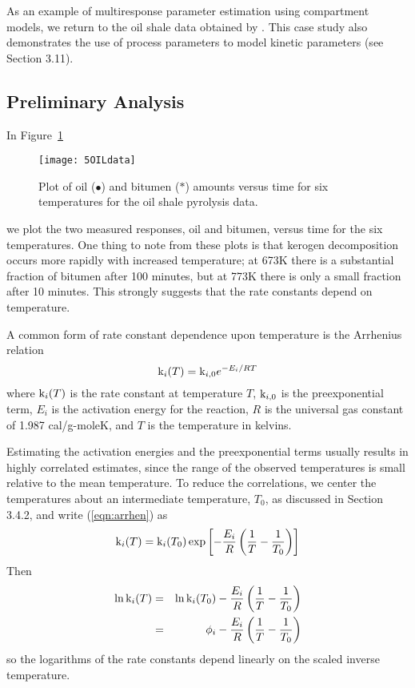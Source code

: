 As an example of multiresponse parameter estimation
using compartment models, we return to the oil shale data obtained by
.
This case study also demonstrates the use of process
parameters to model kinetic parameters (see Section 3.11).
\subsection{Preliminary Analysis}

In Figure~\ref{fig:OILdata}
\begin{figure}
  \centerline{\texttt{[image: 5OILdata]}}%
  \caption{\label{fig:OILdata}
  Plot of oil ($\bullet$) and bitumen ($*$) amounts versus time
  for six temperatures for the oil shale pyrolysis data.
  }
\end{figure}
we plot the two measured responses, oil and bitumen, versus time
for the six temperatures.
One thing to note from these plots is that kerogen decomposition
occurs more rapidly with increased temperature;
at 673K there is a substantial fraction
of bitumen after 100 minutes, but at 773K there
is only a small fraction after 10 minutes.
This strongly suggests that the rate constants depend on temperature.

A common form of rate constant dependence upon temperature
is the Arrhenius relation
$$\label{eqn:arrhen}
{\rm k}_i ( T ) = {\rm k}_{i,0} 
e^{{-} E_i / R T}
$$
where $\mbox{\rm k}_i ( T )$ is the rate constant at temperature $T$,
$\mbox{\rm k}_{i,0}$ is the preexponential term, $E_{i}$ is the activation
energy for the reaction, $R$ is the universal gas constant of 1.987
cal/g-moleK, and $T$ is the temperature in kelvins.

Estimating the activation energies and the preexponential
terms usually results in highly correlated estimates, since
the range of the observed temperatures is small
relative to the mean temperature.
To reduce the correlations, we center the temperatures about
an intermediate temperature, $T_{0}$, as discussed in Section 3.4.2,
and write (\ref{eqn:arrhen})
as
$$
{\rm k}_i ( T ) = {\rm k}_i ( T_0 ) 
\exp {\left[ - { E_i   \over R }\left( {1 \over T }-
{1 \over T_0} \right)\right]}
$$
Then
\begin{eqnarray}\label{eqn:logarr}
  \ln{\rm k}_i ( T )&=&\ln{\rm k}_i ( T_0 )
  - {E_i  \over R }\left( {1 \over T }- {1 \over T_0}\right)\\
  &=&\phi_i
  - {E_i  \over R }\left( {1 \over T }- {1 \over T_0}\right)\nonumber
\end{eqnarray}
so the logarithms of the rate constants depend linearly
on the scaled inverse temperature.

